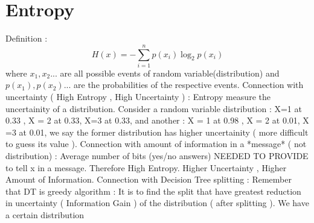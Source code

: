 \documentclass{article}
\begin{document}
\section{Entropy} 
Definition : 
\[H(x) = -\sum_{i=1}^{n} p(x_i) \log_2 p(x_i)\] 
where \(x_1, x_2...\) are all possible events of random variable(distribution) and   \(p(x_1), p(x_2)...\) are the probabilities of the respective events.
\newline
\newline
Connection with uncertainty ( High Entropy , High Uncertainty ) :
\newline
\newline
Entropy measure the uncertainity of a distribution. Consider a random variable distribution :  X=1 at 0.33 , X = 2 at 0.33, X=3 at 0.33, and another : X = 1  at 0.98 , X = 2 at 0.01, X =3 at 0.01, we say the former distribution has higher uncertainity ( more difficult to guess its value ). 
\newline
\newline
Connection with amount of information in a *message* ( not distribution) :
\newline
\newline
Average number of bits (yes/no answers) NEEDED TO PROVIDE to tell x in a message. Therefore High Entropy. Higher Uncertainty , Higher Amount of Information. 
\newline
\newline
Connection with Decision Tree splitting : 
\newline
\newline
Remember that DT is greedy algorithm : It is to find the split that have greatest reduction in uncertainty ( Information Gain ) of the distribution ( after splitting ). We have a certain distribution 
\end{document}
